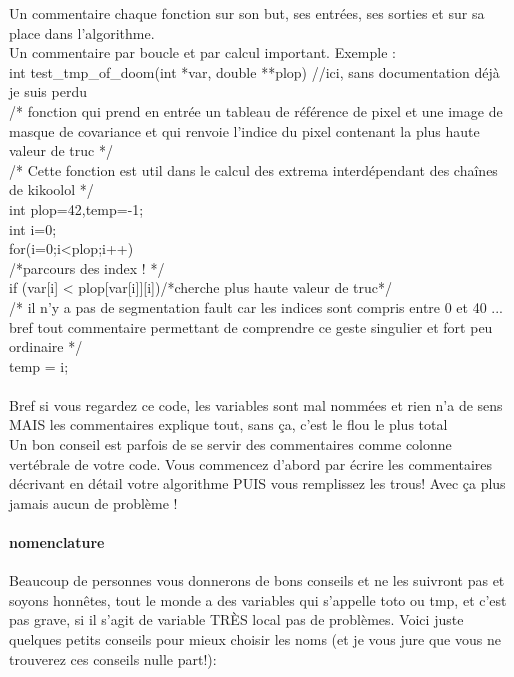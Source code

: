 Un commentaire chaque fonction sur son but, ses entrées, ses sorties et sur sa place dans l'algorithme. \\

Un commentaire par boucle et par calcul important. Exemple :\\

int test\_tmp\_of\_doom(int *var, double **plop) //ici, sans documentation déjà je suis perdu \\ 
/* fonction qui prend en entrée un tableau de référence de pixel et une image de masque de covariance
 et qui renvoie l'indice du pixel contenant la plus haute valeur de truc */\\
/* Cette fonction est util dans le calcul des extrema interdépendant des chaînes de kikoolol */\\

int plop=42,temp=-1;\\
int i=0;\\

for(i=0;i<plop;i++){\\ 
/*parcours des index ! */\\
if (var[i] < plop[var[i]][i])/*cherche plus haute valeur de truc*/\\
/* il n'y a pas de segmentation fault car les indices sont compris entre 0 et 40 ... bref tout
 commentaire permettant de comprendre ce geste singulier et fort peu ordinaire */\\
temp = i;\\
}\\

Bref si vous regardez ce code, les variables sont mal nommées et rien n'a de sens MAIS les
 commentaires explique tout, sans ça, c'est le flou le plus total\\
Un bon conseil est parfois de se servir des commentaires comme colonne vertébrale de votre 
code. Vous commencez d'abord par écrire les commentaires décrivant en détail votre algorithme 
PUIS vous remplissez les trous! Avec ça plus jamais aucun de problème ! \\

\paragraph{nomenclature}

Beaucoup de personnes vous donnerons de bons conseils et ne les suivront pas et soyons honnêtes, 
tout le monde a des variables qui s'appelle toto ou tmp, et c'est pas grave, si il s'agit de 
variable TRÈS local pas de problèmes. Voici juste quelques petits conseils pour mieux choisir 
les noms (et je vous jure que vous ne trouverez ces conseils nulle part!):\\

